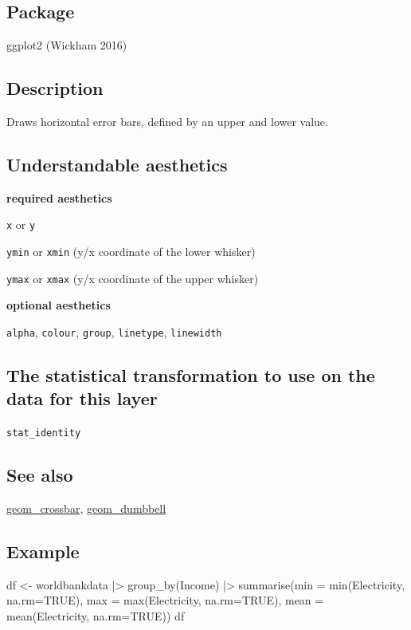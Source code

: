 \documentclass[
  letterpaper,
  DIV=11,
  numbers=noendperiod]{scrreprt}
\newenvironment{Shaded}{\begin{snugshade}}{\end{snugshade}}
\newcommand{\AttributeTok}[1]{\textcolor[rgb]{0.40,0.45,0.13}{#1}}
\newcommand{\ConstantTok}[1]{\textcolor[rgb]{0.56,0.35,0.01}{#1}}
\newcommand{\FunctionTok}[1]{\textcolor[rgb]{0.28,0.35,0.67}{#1}}
\newcommand{\NormalTok}[1]{\textcolor[rgb]{0.00,0.23,0.31}{#1}}
\newcommand{\OtherTok}[1]{\textcolor[rgb]{0.00,0.23,0.31}{#1}}
\newcommand{\SpecialCharTok}[1]{\textcolor[rgb]{0.37,0.37,0.37}{#1}}
\begin{document}
\subsection{Package}\label{package-1}

ggplot2 (Wickham 2016)

\subsection{Description}\label{description-1}

Draws horizontal error bars, defined by an upper and lower value.

\subsection{Understandable
aesthetics}\label{understandable-aesthetics-2}

\textbf{required aesthetics}

\texttt{x} or \texttt{y}

\texttt{ymin} or \texttt{xmin} (y/x coordinate of the lower whisker)

\texttt{ymax} or \texttt{xmax} (y/x coordinate of the upper whisker)

\textbf{optional aesthetics}

\texttt{alpha}, \texttt{colour}, \texttt{group}, \texttt{linetype},
\texttt{linewidth}

\subsection{The statistical transformation to use on the data for this
layer}\label{the-statistical-transformation-to-use-on-the-data-for-this-layer-1}

\texttt{stat\_identity}

\subsection{See also}\label{see-also-1}

\hyperref[crossbar]{geom\_crossbar}, \hyperref[dumbbell]{geom\_dumbbell}

\subsection{Example}\label{example-2}

\begin{Shaded}
\begin{Highlighting}[]
\NormalTok{df }\OtherTok{\textless{}{-}}\NormalTok{ worldbankdata }\SpecialCharTok{|\textgreater{}}
  \FunctionTok{group\_by}\NormalTok{(Income) }\SpecialCharTok{|\textgreater{}}
  \FunctionTok{summarise}\NormalTok{(}\AttributeTok{min =} \FunctionTok{min}\NormalTok{(Electricity, }\AttributeTok{na.rm=}\ConstantTok{TRUE}\NormalTok{), }\AttributeTok{max =} \FunctionTok{max}\NormalTok{(Electricity, }\AttributeTok{na.rm=}\ConstantTok{TRUE}\NormalTok{), }\AttributeTok{mean =} \FunctionTok{mean}\NormalTok{(Electricity, }\AttributeTok{na.rm=}\ConstantTok{TRUE}\NormalTok{))}
\NormalTok{df}
\end{Highlighting}
\end{Shaded}
\end{document}
